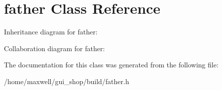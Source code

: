 \hypertarget{classfather}{}\section{father Class Reference}
\label{classfather}


Inheritance diagram for father\+:


Collaboration diagram for father\+:


The documentation for this class was generated from the following file\+:\begin{DoxyCompactItemize}
\item 
/home/maxwell/gui\+\_\+shop/build/father.\+h\end{DoxyCompactItemize}
